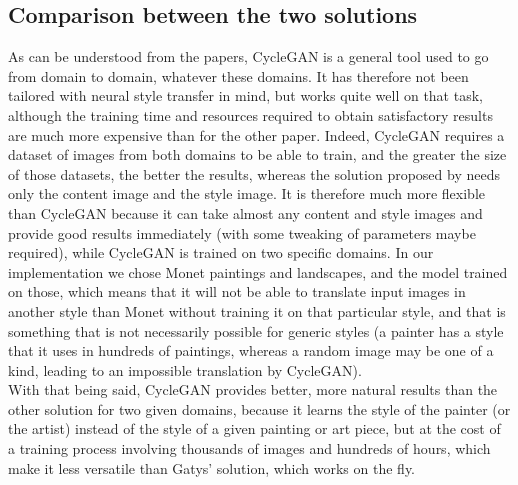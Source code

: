 \documentclass[twocolumn,superscriptaddress,aps,floatfix, nofootinbib]{revtex4-1}
\begin{document}
    \subsection{Comparison between the two solutions}
    
    As can be understood from the papers, CycleGAN is a general tool used to go from domain to domain, whatever these domains. It has therefore not been tailored with neural style transfer in mind, but works quite well on that task, although the training time and resources required to obtain satisfactory results are much more expensive than for the other paper. Indeed, CycleGAN requires a dataset of images from both domains to be able to train, and the greater the size of those datasets, the better the results, whereas the solution proposed by \cite{DBLP:journals/corr/GatysEB15a} needs only the content image and the style image. It is therefore much more flexible than CycleGAN because it can take almost any content and style images and provide good results immediately (with some tweaking of parameters maybe required), while CycleGAN is trained on two specific domains. In our implementation we chose Monet paintings and landscapes, and the model trained on those, which means that it will not be able to translate input images in another style than Monet without training it on that particular style, and that is something that is not necessarily possible for generic styles (a painter has a style that it uses in hundreds of paintings, whereas a random image may be one of a kind, leading to an impossible translation by CycleGAN).\\
    
    With that being said, CycleGAN provides better, more natural results than the other solution for two given domains, because it learns the style of the painter (or the artist) instead of the style of a given painting or art piece, but at the cost of a training process involving thousands of images and hundreds of hours, which make it less versatile than Gatys' solution, which works on the fly.
    
    
    
    
    \appendix
    
    
    
\end{document}
